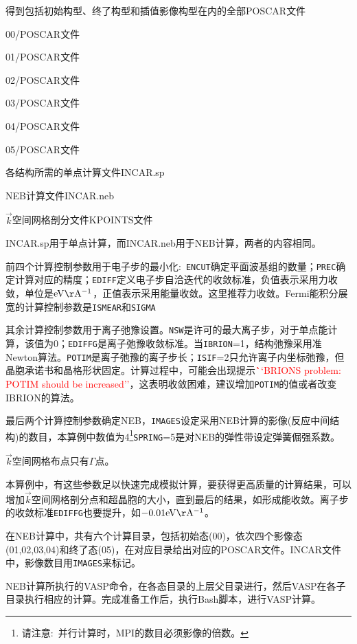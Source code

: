得到包括初始构型、终了构型和插值影像构型在内的全部\textrm{POSCAR}文件

\textrm{00/POSCAR}文件

\textrm{01/POSCAR}文件

\textrm{02/POSCAR}文件

\textrm{03/POSCAR}文件

\textrm{04/POSCAR}文件

\textrm{05/POSCAR}文件

各结构所需的单点计算文件\textrm{INCAR.sp}

\textrm{NEB}计算文件\textrm{INCAR.neb}

$\vec k$空间网格剖分文件\textrm{KPOINTS}文件

\textrm{INCAR.sp}用于单点计算，而\textrm{INCAR.neb}用于\textrm{NEB}计算，两者的内容相同。

前四个计算控制参数用于电子步的最小化:~\texttt{ENCUT}确定平面波基组的数量；\texttt{PREC}确定计算对应的精度；\texttt{EDIFF}定义电子步自洽迭代的收敛标准，负值表示采用力收敛，单位是$\mathrm{eV\AA^{-1}}$，正值表示采用能量收敛。这里推荐力收敛。\textrm{Fermi}能积分展宽的计算控制参数是\texttt{ISMEAR}和\texttt{SIGMA}

其余计算控制参数用于离子弛豫设置。\texttt{NSW}是许可的最大离子步，对于单点能计算，该值为0；\texttt{EDIFFG}是离子弛豫收敛标准。当\texttt{IBRION}=1，结构弛豫采用准\textrm{Newton}算法。\texttt{POTIM}是离子弛豫的离子步长；\texttt{ISIF}=2只允许离子内坐标弛豫，但晶胞承诺书和晶格形状固定。计算过程中，可能会出现提示\textcolor{red}{\textbf ``BRIONS problem: POTIM should be increased''}，这表明收敛困难，建议增加\texttt{POTIM}的值或者改变\textrm{IBRION}的算法。

最后两个计算控制参数确定\textrm{NEB}，\texttt{IMAGES}设定采用\textrm{NEB}计算的影像(反应中间结构)的数目，本算例中数值为4\footnote{请注意:~并行计算时，\textrm{MPI}的数目必须影像的倍数。}\texttt{SPRING}=5是对\textrm{NEB}的弹性带设定弹簧倔强系数。

$\vec k$空间网格布点只有$\Gamma$点。

本算例中，有这些参数足以快速完成模拟计算，要获得更高质量的计算结果，可以增加$\vec k$空间网格剖分点和超晶胞的大小，直到最后的结果，如形成能收敛。离子步的收敛标准\texttt{EDIFFG}也要提升，如$-0.01\mathrm{eV\AA^{-1}}$。

在\textrm{NEB}计算中，共有六个计算目录，包括初始态(00)，依次四个影像态(01,02,03,04)和终了态(05)，在对应目录给出对应的\textrm{POSCAR}文件。\textrm{INCAR}文件中，影像数目用\texttt{IMAGES}来标记。

\textrm{NEB}计算所执行的\textrm{VASP}命令，在各态目录的上层父目录进行，然后\textrm{VASP}在各子目录执行相应的计算。完成准备工作后，执行\textrm{Bash}脚本，进行\textrm{VASP}计算。

